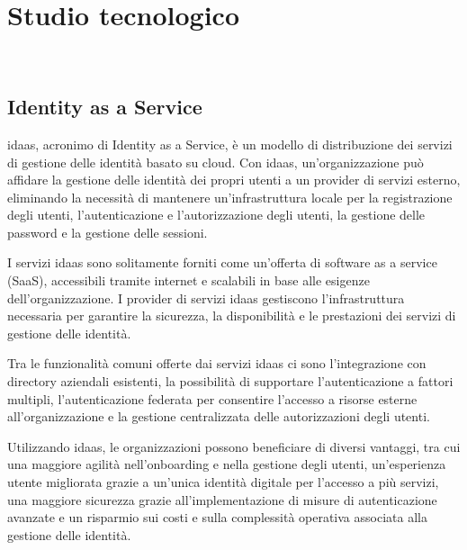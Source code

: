 
\chapter{Studio tecnologico}
\label{cap:studio-tecnologico}

\\


\section{Identity as a Service}

\acrshort{idaas}\cite{site:idaas}, acronimo di Identity as a Service, è un modello di distribuzione dei servizi di gestione delle identità basato su cloud. Con \acrshort{idaas}, un'organizzazione può affidare la gestione delle identità dei propri utenti a un provider di servizi esterno, eliminando la necessità di mantenere un'infrastruttura locale per la registrazione degli utenti, l'autenticazione e l'autorizzazione degli utenti, la gestione delle password e la gestione delle sessioni.

I servizi \acrshort{idaas} sono solitamente forniti come un'offerta di software as a service (SaaS), accessibili tramite internet e scalabili in base alle esigenze dell'organizzazione. I provider di servizi \acrshort{idaas} gestiscono l'infrastruttura necessaria per garantire la sicurezza, la disponibilità e le prestazioni dei servizi di gestione delle identità.

Tra le funzionalità comuni offerte dai servizi \acrshort{idaas} ci sono l'integrazione con directory aziendali esistenti, la possibilità di supportare l'autenticazione a fattori multipli, l'autenticazione federata per consentire l'accesso a risorse esterne all'organizzazione e la gestione centralizzata delle autorizzazioni degli utenti.

Utilizzando \acrshort{idaas}, le organizzazioni possono beneficiare di diversi vantaggi, tra cui una maggiore agilità nell'onboarding e nella gestione degli utenti, un'esperienza utente migliorata grazie a un'unica identità digitale per l'accesso a più servizi, una maggiore sicurezza grazie all'implementazione di misure di autenticazione avanzate e un risparmio sui costi e sulla complessità operativa associata alla gestione delle identità.

